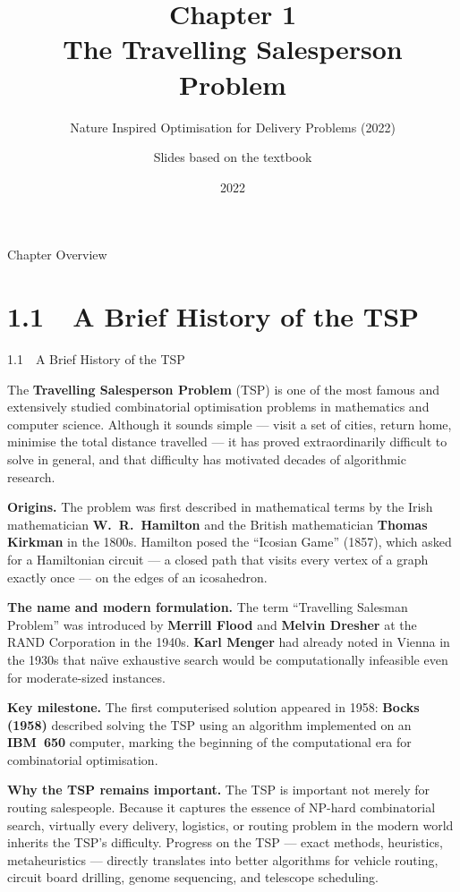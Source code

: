 \documentclass[aspectratio=169,10pt]{beamer}
\title[Chapter 1: TSP]{Chapter 1\\The Travelling Salesperson Problem}
\subtitle{Nature Inspired Optimisation for Delivery Problems (2022)}
\author{Slides based on the textbook}
\date{2022}
\begin{document}

\begin{frame}
  \titlepage
\end{frame}

\begin{frame}{Chapter Overview}
  \tableofcontents
\end{frame}

\section{1.1~~A Brief History of the TSP}

\begin{frame}[allowframebreaks]{1.1~~A Brief History of the TSP}

  The \textbf{Travelling Salesperson Problem} (TSP) is one of the most
  famous and extensively studied combinatorial optimisation problems in
  mathematics and computer science.  Although it sounds simple --- visit a
  set of cities, return home, minimise the total distance travelled --- it
  has proved extraordinarily difficult to solve in general, and that
  difficulty has motivated decades of algorithmic research.

  \medskip
  \textbf{Origins.}
  The problem was first described in mathematical terms by the Irish
  mathematician \textbf{W.~R.~Hamilton} and the British mathematician
  \textbf{Thomas Kirkman} in the 1800s.  Hamilton posed the ``Icosian Game''
  (1857), which asked for a Hamiltonian circuit --- a closed path that
  visits every vertex of a graph exactly once --- on the edges of an
  icosahedron.

  \medskip
  \textbf{The name and modern formulation.}
  The term ``Travelling Salesman Problem'' was introduced by
  \textbf{Merrill Flood} and \textbf{Melvin Dresher} at the RAND
  Corporation in the 1940s.  \textbf{Karl Menger} had already noted in
  Vienna in the 1930s that na\"{\i}ve exhaustive search would be
  computationally infeasible even for moderate-sized instances.

  \medskip
  \textbf{Key milestone.}
  The first computerised solution appeared in 1958: \textbf{Bocks (1958)}
  described solving the TSP using an algorithm implemented on an
  \textbf{IBM~650} computer, marking the beginning of the computational
  era for combinatorial optimisation.

  \medskip
  \textbf{Why the TSP remains important.}
  The TSP is important not merely for routing salespeople.  Because it
  captures the essence of NP-hard combinatorial search, virtually every
  delivery, logistics, or routing problem in the modern world inherits
  the TSP's difficulty.  Progress on the TSP --- exact methods,
  heuristics, metaheuristics --- directly translates into better
  algorithms for vehicle routing, circuit board drilling, genome
  sequencing, and telescope scheduling.

\end{frame}
\end{document}
